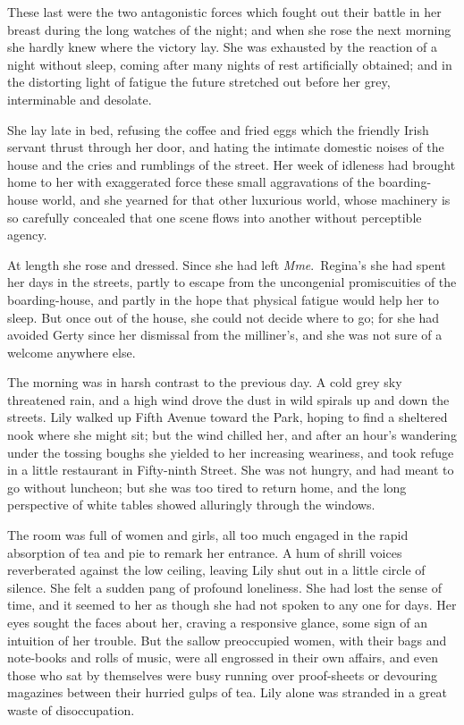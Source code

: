 \documentclass[12pt,a4paper]{book}
\begin{document}
These last were the two antagonistic forces which fought out
their battle in her breast during the long watches of the night;
and when she rose the next morning she hardly knew where the
victory lay. She was exhausted by the reaction of a night without
sleep, coming after many nights of rest artificially obtained;
and in the distorting light of fatigue the future stretched out
before her grey, interminable and desolate.





She lay late in bed, refusing the coffee and fried eggs which the
friendly Irish servant thrust through her door, and hating the
intimate domestic noises of the house and the cries and rumblings
of the street. Her week of idleness had brought home to her with
exaggerated force these small aggravations of the boarding-house
world, and she yearned for that other luxurious world, whose
machinery is so carefully concealed that one scene flows into
another without perceptible agency.





At length she rose and dressed. Since she had left \textit{Mme}.\ Regina's
she had spent her days in the streets, partly to escape from the
uncongenial promiscuities of the boarding-house, and partly in
the hope that physical fatigue would help her to sleep. But once
out of the house, she could not decide where to go; for she had
avoided Gerty since her dismissal from the milliner's, and she
was not sure of a welcome anywhere else.





The morning was in harsh contrast to the previous day. A cold
grey sky threatened rain, and a high wind drove the dust in wild
spirals up and down the streets. Lily walked up Fifth Avenue
toward the Park, hoping to find a sheltered nook where she might
sit; but the wind chilled her, and after an hour's wandering
under the tossing boughs she yielded to her increasing weariness,
and took refuge in a little restaurant in Fifty-ninth Street. She
was not hungry, and had meant to go without luncheon; but she was
too tired to return home, and the long perspective of white
tables showed alluringly through the windows.





The room was full of women and girls, all too much engaged in the
rapid absorption of tea and pie to remark her entrance. A hum of
shrill voices reverberated against the low ceiling, leaving Lily
shut out in a little circle of silence. She felt a sudden pang of
profound loneliness. She had lost the sense of time, and
it seemed to her as though she had not spoken to any one for
days. Her eyes sought the faces about her, craving a responsive
glance, some sign of an intuition of her trouble. But the sallow
preoccupied women, with their bags and note-books and rolls of
music, were all engrossed in their own affairs, and even those
who sat by themselves were busy running over proof-sheets or
devouring magazines between their hurried gulps of tea. Lily
alone was stranded in a great waste of disoccupation.
\end{document}
